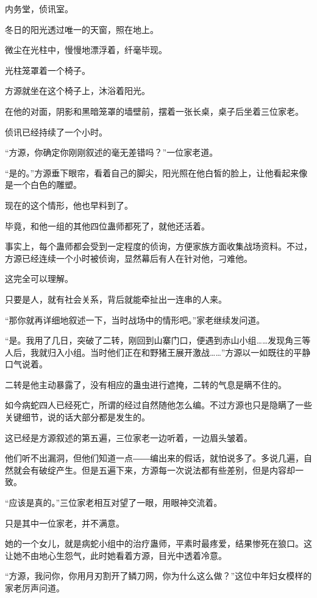 
\begin{this_body}

内务堂，侦讯室。

冬日的阳光透过唯一的天窗，照在地上。

微尘在光柱中，慢慢地漂浮着，纤毫毕现。

光柱笼罩着一个椅子。

方源就坐在这个椅子上，沐浴着阳光。

在他的对面，阴影和黑暗笼罩的墙壁前，摆着一张长桌，桌子后坐着三位家老。

侦讯已经持续了一个小时。

“方源，你确定你刚刚叙述的毫无差错吗？”一位家老道。

“是的。”方源垂下眼帘，看着自己的脚尖，阳光照在他白皙的脸上，让他看起来像是一个白色的雕塑。

现在的这个情形，他也早料到了。

毕竟，和他一组的其他四位蛊师都死了，就他还活着。

事实上，每个蛊师都会受到一定程度的侦询，方便家族方面收集战场资料。不过，方源已经连续一个小时被侦询，显然幕后有人在针对他，刁难他。

这完全可以理解。

只要是人，就有社会关系，背后就能牵扯出一连串的人来。

“那你就再详细地叙述一下，当时战场中的情形吧。”家老继续发问道。

“是。我用了几日，突破了二转，刚回到山寨门口，便遇到赤山小组……发现角三等人后，我就归入小组。当时他们正在和野猪王展开激战……”方源以一如既往的平静口气说着。

二转是他主动暴露了，没有相应的蛊虫进行遮掩，二转的气息是瞒不住的。

如今病蛇四人已经死亡，所谓的经过自然随他怎么编。不过方源也只是隐瞒了一些关键细节，说的话大部分都是发生的。

这已经是方源叙述的第五遍，三位家老一边听着，一边眉头皱着。

他们听不出漏洞，但他们知道一点――编出来的假话，就怕说多了。多说几遍，自然就会有破绽产生。但是五遍下来，方源每一次说法都有些差别，但是内容却一致。

“应该是真的。”三位家老相互对望了一眼，用眼神交流着。

只是其中一位家老，并不满意。

她的一个女儿，就是病蛇小组中的治疗蛊师，平素时最疼爱，结果惨死在狼口。这让她不由地心生怨气，此时她看着方源，目光中透着冷意。

“方源，我问你，你用月刃割开了鳞刀网，你为什么这么做？”这位中年妇女模样的家老厉声问道。


\end{this_body}
